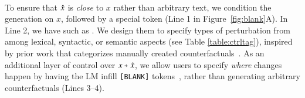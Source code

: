 \paragraph{}
To ensure that $\hat{x}$ is \emph{close} to $x$ rather than arbitrary text, we condition the generation on $x$, followed by a special token (Line 1 in Figure~\ref{fig:blank}A).
In Line 2, we have \emph{\tagstrs} \cite{ctrl} such as .
We design them to specify types of perturbation from among lexical, syntactic, or semantic aspects (see Table \ref{table:ctrltag}), inspired by prior work that categorizes manually created counterfactuals~\cite{kaushik2019learning, gardner2020contrast}.
As an additional layer of control over $x \veryshortarrow \xp$, %
we allow users to specify \emph{where} changes happen by having the LM infill \texttt{[BLANK]} tokens~\cite{donahue2020enabling}, rather than generating arbitrary counterfactuals (Lines 3--4).





